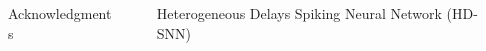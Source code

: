 \documentclass[final]{beamer}
\newlength{\sepwidth}
\newlength{\colwidth}
\newcommand{\separatorcolumn}{\begin{column}{\sepwidth}\end{column}}
\begin{document}
\begin{frame}[t]
\begin{columns}[t]
\begin{column}{\colwidth}
%
%
%
%
%
%
%
%
%
%
  \begin{alertblock}{Acknowledgments}
  \Funding
  \end{alertblock}
\end{column}

\separatorcolumn

\begin{column}{\colwidth}

   \begin{block}{Heterogeneous Delays Spiking Neural Network (HD-SNN)~\parencite{Grimaldi23BC}}


\end{block}
\end{column}
\end{columns}
\end{frame}
\end{document}
